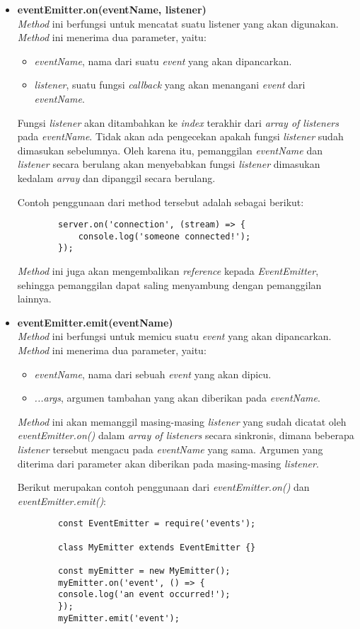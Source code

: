 \begin{itemize}
	\item \textbf{eventEmitter.on(eventName, listener)} \\ \textit{Method} ini berfungsi untuk mencatat suatu listener yang akan digunakan. \textit{Method} ini menerima dua parameter, yaitu:
	\begin{itemize}
		\item \textit{eventName}, nama dari suatu \textit{event} yang akan dipancarkan.
		\item \textit{listener}, suatu fungsi \textit{callback} yang akan menangani \textit{event} dari \textit{eventName}.
	\end{itemize} 
	Fungsi \textit{listener} akan ditambahkan ke \textit{index} terakhir dari \textit{array of listeners} pada \textit{eventName}. Tidak akan ada pengecekan apakah fungsi \textit{listener} sudah dimasukan sebelumnya. Oleh karena itu, pemanggilan \textit{eventName} dan \textit{listener} secara berulang akan menyebabkan fungsi \textit{listener} dimasukan kedalam \textit{array} dan dipanggil secara berulang.
	
	Contoh penggunaan dari method tersebut adalah sebagai berikut:
	\begin{lstlisting}
		server.on('connection', (stream) => {
			console.log('someone connected!');	
		});
	\end{lstlisting}
	
	\textit{Method} ini juga akan mengembalikan \textit{reference} kepada \textit{EventEmitter}, sehingga pemanggilan dapat saling menyambung dengan pemanggilan lainnya.
	
	\item \textbf{eventEmitter.emit(eventName)} \\ \textit{Method} ini berfungsi untuk memicu suatu \textit{event} yang akan dipancarkan. \textit{Method} ini menerima dua parameter, yaitu:
	\begin{itemize}
		\item \textit{eventName}, nama dari sebuah \textit{event} yang akan dipicu.
		\item \textit{...args}, argumen tambahan yang akan diberikan pada \textit{eventName}. 
	\end{itemize}

	\textit{Method} ini akan memanggil masing-masing \textit{listener} yang sudah dicatat oleh \textit{eventEmitter.on()} dalam \textit{array of listeners} secara sinkronis, dimana beberapa \textit{listener} tersebut mengacu pada \textit{eventName} yang sama. Argumen yang diterima dari parameter akan diberikan pada masing-masing \textit{listener}.
	
	Berikut merupakan contoh penggunaan dari \textit{eventEmitter.on()} dan \textit{eventEmitter.emit()}:
	\begin{lstlisting}
		const EventEmitter = require('events');
		
		class MyEmitter extends EventEmitter {}
		
		const myEmitter = new MyEmitter();
		myEmitter.on('event', () => {
		console.log('an event occurred!');
		});
		myEmitter.emit('event');
	\end{lstlisting} 
\end{itemize}
